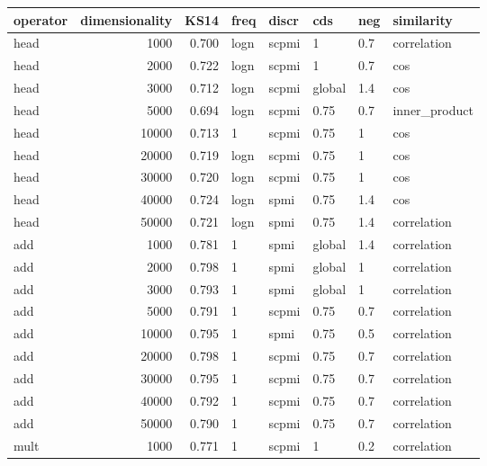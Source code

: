 \begin{tabular}{lrrlllll}
\toprule
operator &  dimensionality &   KS14 &  freq &  discr &     cds &  neg &     similarity \\
\midrule
    head &            1000 &  0.700 &  logn &  scpmi &       1 &  0.7 &    correlation \\
    head &            2000 &  0.722 &  logn &  scpmi &       1 &  0.7 &            cos \\
    head &            3000 &  0.712 &  logn &  scpmi &  global &  1.4 &            cos \\
    head &            5000 &  0.694 &  logn &  scpmi &    0.75 &  0.7 &  inner\_product \\
    head &           10000 &  0.713 &     1 &  scpmi &    0.75 &    1 &            cos \\
    head &           20000 &  0.719 &  logn &  scpmi &    0.75 &    1 &            cos \\
    head &           30000 &  0.720 &  logn &  scpmi &    0.75 &    1 &            cos \\
    head &           40000 &  0.724 &  logn &   spmi &    0.75 &  1.4 &            cos \\
    head &           50000 &  0.721 &  logn &   spmi &    0.75 &  1.4 &    correlation \\
     add &            1000 &  0.781 &     1 &   spmi &  global &  1.4 &    correlation \\
     add &            2000 &  0.798 &     1 &   spmi &  global &    1 &    correlation \\
     add &            3000 &  0.793 &     1 &   spmi &  global &    1 &    correlation \\
     add &            5000 &  0.791 &     1 &  scpmi &    0.75 &  0.7 &    correlation \\
     add &           10000 &  0.795 &     1 &   spmi &    0.75 &  0.5 &    correlation \\
     add &           20000 &  0.798 &     1 &  scpmi &    0.75 &  0.7 &    correlation \\
     add &           30000 &  0.795 &     1 &  scpmi &    0.75 &  0.7 &    correlation \\
     add &           40000 &  0.792 &     1 &  scpmi &    0.75 &  0.7 &    correlation \\
     add &           50000 &  0.790 &     1 &  scpmi &    0.75 &  0.7 &    correlation \\
    mult &            1000 &  0.771 &     1 &  scpmi &       1 &  0.2 &    correlation \\

\end{tabular}
